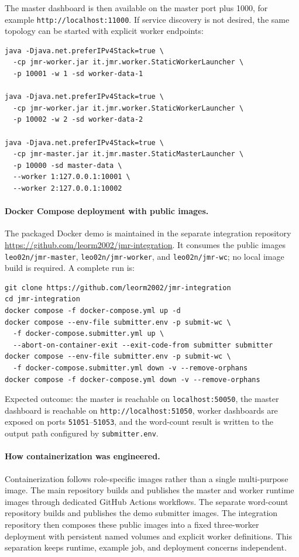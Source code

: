 \documentclass{scrartcl}
\begin{document}
The master dashboard is then available on the master port plus 1000, for example \texttt{http://localhost:11000}. If service discovery is not desired, the same topology can be started with explicit worker endpoints:
%
\begin{verbatim}
java -Djava.net.preferIPv4Stack=true \
  -cp jmr-worker.jar it.jmr.worker.StaticWorkerLauncher \
  -p 10001 -w 1 -sd worker-data-1

java -Djava.net.preferIPv4Stack=true \
  -cp jmr-worker.jar it.jmr.worker.StaticWorkerLauncher \
  -p 10002 -w 2 -sd worker-data-2

java -Djava.net.preferIPv4Stack=true \
  -cp jmr-master.jar it.jmr.master.StaticMasterLauncher \
  -p 10000 -sd master-data \
  --worker 1:127.0.0.1:10001 \
  --worker 2:127.0.0.1:10002
\end{verbatim}

\paragraph{Docker Compose deployment with public images.}
The packaged Docker demo is maintained in the separate integration repository \url{https://github.com/leorm2002/jmr-integration}. It consumes the public images \texttt{leo02n/jmr-master}, \texttt{leo02n/jmr-worker}, and \texttt{leo02n/jmr-wc}; no local image build is required. A complete run is:
%
\begin{verbatim}
git clone https://github.com/leorm2002/jmr-integration
cd jmr-integration
docker compose -f docker-compose.yml up -d
docker compose --env-file submitter.env -p submit-wc \
  -f docker-compose.submitter.yml up \
  --abort-on-container-exit --exit-code-from submitter submitter
docker compose --env-file submitter.env -p submit-wc \
  -f docker-compose.submitter.yml down -v --remove-orphans
docker compose -f docker-compose.yml down -v --remove-orphans
\end{verbatim}

Expected outcome: the master is reachable on \texttt{localhost:50050}, the master dashboard is reachable on \texttt{http://localhost:51050}, worker dashboards are exposed on ports \texttt{51051}--\texttt{51053}, and the word-count result is written to the output path configured by \texttt{submitter.env}.

\paragraph{How containerization was engineered.}
Containerization follows role-specific images rather than a single multi-purpose image. The main repository builds and publishes the master and worker runtime images through dedicated GitHub Actions workflows. The separate word-count repository builds and publishes the demo submitter images. The integration repository then composes these public images into a fixed three-worker deployment with persistent named volumes and explicit worker definitions. This separation keeps runtime, example job, and deployment concerns independent.
\end{document}
